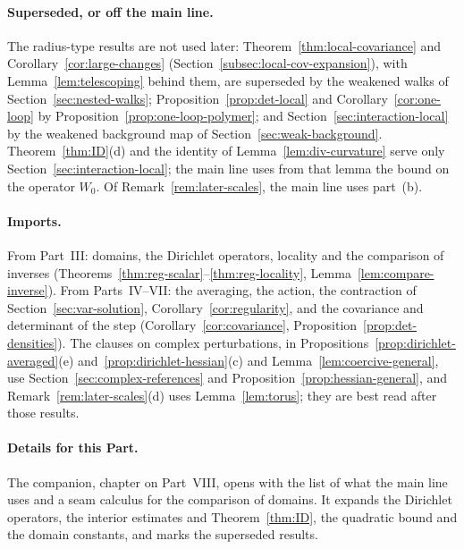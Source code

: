 \paragraph{Superseded, or off the main line.} The radius-type results are not used later: Theorem~\ref{thm:local-covariance} and Corollary~\ref{cor:large-changes} (Section~\ref{subsec:local-cov-expansion}), with Lemma~\ref{lem:telescoping} behind them, are superseded by the weakened walks of Section~\ref{sec:nested-walks}; Proposition~\ref{prop:det-local} and Corollary~\ref{cor:one-loop} by Proposition~\ref{prop:one-loop-polymer}; and Section~\ref{sec:interaction-local} by the weakened background map of Section~\ref{sec:weak-background}. Theorem~\ref{thm:ID}(d) and the identity of Lemma~\ref{lem:div-curvature} serve only Section~\ref{sec:interaction-local}; the main line uses from that lemma the bound on the operator $W_0$. Of Remark~\ref{rem:later-scales}, the main line uses part~(b).

\paragraph{Imports.} From Part~III: domains, the Dirichlet operators, locality and the comparison of inverses (Theorems~\ref{thm:reg-scalar}--\ref{thm:reg-locality}, Lemma~\ref{lem:compare-inverse}). From Parts~IV--VII: the averaging, the action, the contraction of Section~\ref{sec:var-solution}, Corollary~\ref{cor:regularity}, and the covariance and determinant of the step (Corollary~\ref{cor:covariance}, Proposition~\ref{prop:det-densities}). The clauses on complex perturbations, in Propositions~\ref{prop:dirichlet-averaged}(e) and~\ref{prop:dirichlet-hessian}(c) and Lemma~\ref{lem:coercive-general}, use Section~\ref{sec:complex-references} and Proposition~\ref{prop:hessian-general}, and Remark~\ref{rem:later-scales}(d) uses Lemma~\ref{lem:torus}; they are best read after those results.

\paragraph{Details for this Part.} The companion, chapter on Part~VIII, opens with the list of what the main line uses and a seam calculus for the comparison of domains. It expands the Dirichlet operators, the interior estimates and Theorem~\ref{thm:ID}, the quadratic bound and the domain constants, and marks the superseded results.
